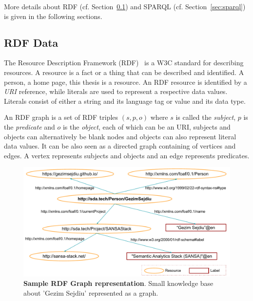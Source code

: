 More details about \gls{RDF} (cf. Section~\ref{sec:rdf-data}) and \gls{SPARQL} (cf. Section~\ref{sec:sparql}) is given in the following sections.
\addtocounter{footnote}{-1}


\subsection{RDF Data}
\label{sec:rdf-data}

The Resource Description Framework (\gls{RDF})~\cite{Wood:14:RCA} is a \gls{W3C} standard for describing resources.
A resource is a fact or a thing that can be described and identified. 
A person, a home page, this thesis is a resource. 
An RDF resource is identified by a \emph{\gls{URI}} reference, while literals are used to represent a respective data values.
Literals consist of either a string and its language tag or value and its data type.

An \gls{RDF} graph is a set of \gls{RDF} triples $(s,p,o)$ where $s$ is called the \emph{subject}, $p$ is the \emph{predicate} and $o$ is the \emph{object}, each of which can be an \gls{URI}, subjects and objects can alternatively be blank nodes and objects can also represent literal data values.
It can be also seen as a directed graph containing of vertices and edges. 
A vertex represents subjects and objects and an edge represents predicates.

\begin{figure}
\centering
\includegraphics[width=1.0\columnwidth]{images/2_preliminaries/rdf-triple-example.pdf}
 \caption{\textbf{Sample RDF Graph representation}. Small knowledge base about 'Gezim Sejdiu' represented as a graph.}
\label{fig:preliminaries-rdf-graph-sample}
\end{figure}

